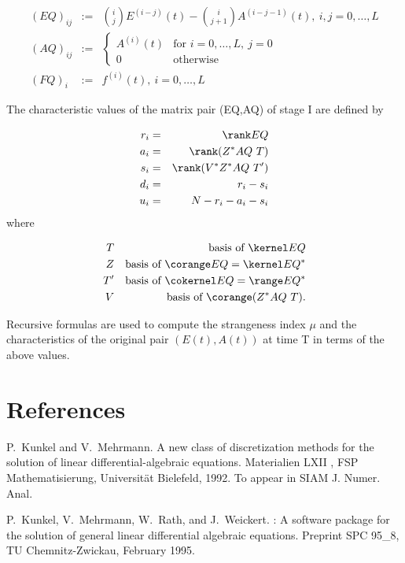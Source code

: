 \begin{eqnarray*}
  (EQ)_{ij} &:=& {i \choose j} E^{(i-j)}(t) 
  - {i \choose j+1}A^{(i-j-1)}(t),\ i,j=0,\dots,L \\ 
  (AQ)_{ij} &:=& \left\{
    \begin{array}{cl}
      A^{(i)}(t) & \mbox{for } i=0,\dots,L,\ j=0 \\
      0          & \mbox{otherwise} 
    \end{array} 
  \right. \\
  (FQ)_i &:=& f^{(i)}(t),\ i=0,\dots,L
\end{eqnarray*}

The characteristic values of the matrix pair (EQ,AQ) of stage I are
defined by 

\begin{eqnarray*}
  r_i &=& \rank EQ \\
  a_i &=& \rank (Z^* AQ\ T) \\
  s_i &=& \rank (V^* Z^* AQ\ T') \\
  d_i &=& r_i - s_i \\
  u_i &=& N - r_i - a_i - s_i
\end{eqnarray*}
where 

\begin{eqnarray*}
    T &&\mbox {\rm basis of }\kernel EQ\\
    Z &&\mbox{\rm basis of }\corange EQ=\kernel EQ^* \\
    T' &&\mbox{\rm basis of }\cokernel EQ=\range EQ^*\\
    V &&\mbox{\rm basis of }\corange (Z^*AQ\ T).
\end{eqnarray*}

Recursive formulas are used to compute the strangeness index $\mu$ and
the characteristics of the original pair $(E(t), A(t))$ at time T in
terms of the above values.

\section{References}

\begin{thebibliography}{1}
P.~Kunkel and V.~Mehrmann.
\newblock A new class of discretization methods for the solution of linear
  differential-algebraic equations.
\newblock Materialien LXII , FSP Mathematisierung, Universit{\"a}t Bielefeld,
  1992.
\newblock To appear in SIAM J. Numer. Anal.

P.~Kunkel, V.~Mehrmann, W.~Rath, and J.~Weickert.
: A software package for the solution of general linear
  differential algebraic equations.
\newblock Preprint SPC 95\_8, TU Chemnitz-Zwickau, February 1995.

\end{thebibliography}








